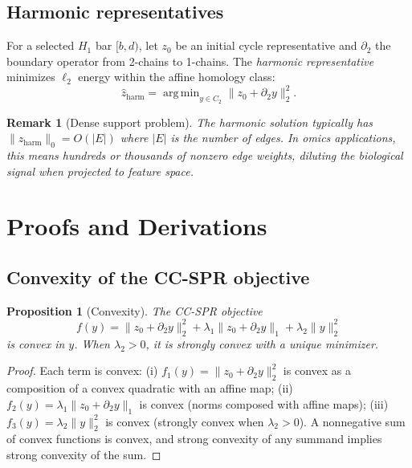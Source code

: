 \documentclass[11pt]{article}
\newtheorem{proposition}[theorem]{Proposition}
\newtheorem{remark}[theorem]{Remark}
\DeclareMathOperator*{\argmin}{arg\,min}
\begin{document}
\subsection{Harmonic representatives}

For a selected $H_1$ bar $[b, d)$, let $z_0$ be an initial cycle representative and $\partial_2$ the boundary operator from 2-chains to 1-chains.
The \emph{harmonic representative} minimizes $\ell_2$ energy within the affine homology class:
\[
\hat{z}_{\mathrm{harm}} = \argmin_{y \in C_2} \| z_0 + \partial_2 y \|_2^2.
\]

\begin{remark}[Dense support problem]\label{rem:dense}
The harmonic solution typically has $\|\hat{z}_{\mathrm{harm}}\|_0 = O(|E|)$ where $|E|$ is the number of edges.
In omics applications, this means hundreds or thousands of nonzero edge weights, diluting the biological signal when projected to feature space.
\end{remark}

\section{Proofs and Derivations}
\label{sec:supp_proofs}

\subsection{Convexity of the CC-SPR objective}

\begin{proposition}[Convexity]\label{prop:convex}
The CC-SPR objective
\[
f(y) = \| z_0 + \partial_2 y \|_2^2 + \lambda_1 \| z_0 + \partial_2 y \|_1 + \lambda_2 \| y \|_2^2
\]
is convex in $y$. When $\lambda_2 > 0$, it is strongly convex with a unique minimizer.
\end{proposition}

\begin{proof}
Each term is convex:
(i) $f_1(y) = \|z_0 + \partial_2 y\|_2^2$ is convex as a composition of a convex quadratic with an affine map;
(ii) $f_2(y) = \lambda_1 \|z_0 + \partial_2 y\|_1$ is convex (norms composed with affine maps);
(iii) $f_3(y) = \lambda_2 \|y\|_2^2$ is convex (strongly convex when $\lambda_2 > 0$).
A nonnegative sum of convex functions is convex, and strong convexity of any summand implies strong convexity of the sum.
\end{proof}
\end{document}
